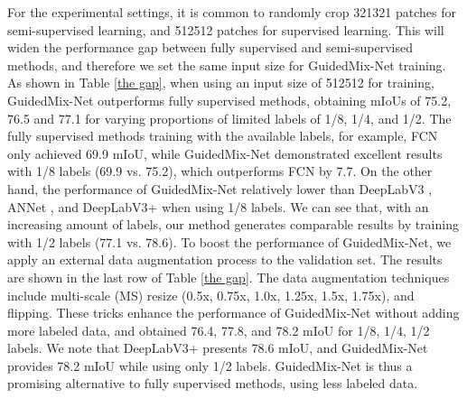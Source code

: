 For the experimental settings, it is common to randomly crop 321321 patches for semi-supervised learning, and 512512 patches for supervised learning.
This will widen the performance gap between fully supervised and semi-supervised methods, and therefore we set the same input size for GuidedMix-Net training.
As shown in Table \ref{the gap}, when using an input size of 512512 for training, GuidedMix-Net outperforms fully supervised methods, obtaining mIoUs of 75.2, 76.5 and 77.1 for varying proportions of limited labels of 1/8, 1/4, and 1/2.
The fully supervised methods training with the available labels, for example, FCN \cite{long2015fully} only achieved 69.9 mIoU, while GuidedMix-Net demonstrated excellent results with 1/8 labels (69.9 vs. 75.2), which outperforms FCN by 7.7.
On the  other hand, the performance of GuidedMix-Net relatively lower than DeepLabV3 \cite{chen2017deeplab}, ANNet \cite{annn}, and DeepLabV3+ \cite{Chen2018EncoderDecoderWA} when using 1/8 labels.
We can see that, with an increasing amount of labels, our method generates comparable results by training with 1/2 labels (77.1 vs. 78.6).
To boost the performance of GuidedMix-Net, we apply an external data augmentation process to the validation set.
The results are shown in the last row of Table \ref{the gap}.
The data augmentation techniques include multi-scale (MS) resize (0.5x, 0.75x, 1.0x, 1.25x, 1.5x, 1.75x), and flipping.
These tricks enhance the performance of GuidedMix-Net without adding more labeled data, and obtained 76.4, 77.8, and 78.2 mIoU for 1/8, 1/4, 1/2 labels.
We note that DeepLabV3+ presents 78.6 mIoU, and GuidedMix-Net provides 78.2 mIoU while using only 1/2 labels.
GuidedMix-Net is thus a promising alternative to fully supervised methods, using less labeled data.
